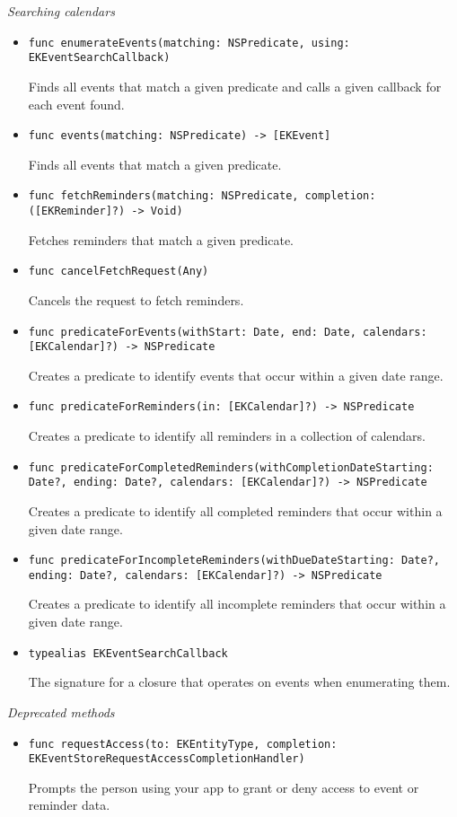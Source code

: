 \documentclass{article}
\begin{document}
\textit{Searching calendars}
\begin{itemize}
    \item \texttt{func enumerateEvents(matching: NSPredicate, using: EKEventSearchCallback)}

    Finds all events that match a given predicate and calls a given callback for each event found.
    \item \texttt{func events(matching: NSPredicate) -> [EKEvent]}

    Finds all events that match a given predicate.
    \item \texttt{func fetchReminders(matching: NSPredicate, completion: ([EKReminder]?) -> Void)}

    Fetches reminders that match a given predicate.
    \item \texttt{func cancelFetchRequest(Any)}

    Cancels the request to fetch reminders.
    \item \texttt{func predicateForEvents(withStart: Date, end: Date, calendars: [EKCalendar]?) -> NSPredicate}

    Creates a predicate to identify events that occur within a given date range.
    \item \texttt{func predicateForReminders(in: [EKCalendar]?) -> NSPredicate}

    Creates a predicate to identify all reminders in a collection of calendars.
    \item \texttt{func predicateForCompletedReminders(withCompletionDateStarting: Date?, ending: Date?, calendars: [EKCalendar]?) -> NSPredicate}

    Creates a predicate to identify all completed reminders that occur within a given date range.
    \item \texttt{func predicateForIncompleteReminders(withDueDateStarting: Date?, ending: Date?, calendars: [EKCalendar]?) -> NSPredicate}

    Creates a predicate to identify all incomplete reminders that occur within a given date range.
    \item \texttt{typealias EKEventSearchCallback}

    The signature for a closure that operates on events when enumerating them.
\end{itemize}

\textit{Deprecated methods}
\begin{itemize}
    \item \texttt{func requestAccess(to: EKEntityType, completion: EKEventStoreRequestAccessCompletionHandler)}

    Prompts the person using your app to grant or deny access to event or reminder data.
\end{itemize}
\end{document}
